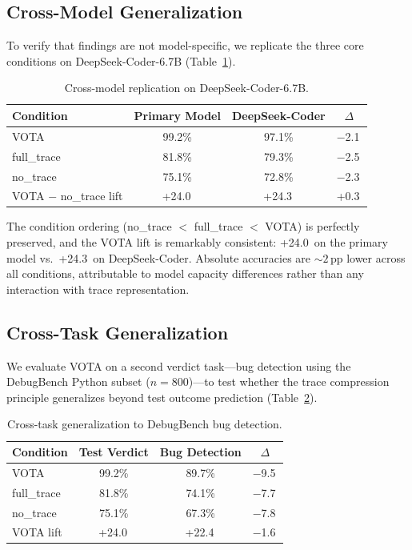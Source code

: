 \documentclass[11pt]{article}
\newcommand{\vota}{\textsc{VOTA}}
\newcommand{\pp}{\,\text{pp}}
\begin{document}
\subsection{Cross-Model Generalization}

To verify that findings are not model-specific, we replicate the three core conditions on DeepSeek-Coder-6.7B (Table~\ref{tab:crossmodel}).

\begin{table}[t]
\centering
\caption{Cross-model replication on DeepSeek-Coder-6.7B.}
\label{tab:crossmodel}
\small
\begin{tabular}{lccc}
\toprule
\textbf{Condition} & \textbf{Primary Model} & \textbf{DeepSeek-Coder} & \textbf{$\Delta$} \\
\midrule
\vota{} & 99.2\% & 97.1\% & $-$2.1\pp{} \\
full\_trace & 81.8\% & 79.3\% & $-$2.5\pp{} \\
no\_trace & 75.1\% & 72.8\% & $-$2.3\pp{} \\
\midrule
\vota{} $-$ no\_trace lift & +24.0\pp{} & +24.3\pp{} & +0.3\pp{} \\
\bottomrule
\end{tabular}
\end{table}

The condition ordering (no\_trace $<$ full\_trace $<$ \vota{}) is perfectly preserved, and the \vota{} lift is remarkably consistent: +24.0\pp{} on the primary model vs.\ +24.3\pp{} on DeepSeek-Coder. Absolute accuracies are ${\sim}2\pp$ lower across all conditions, attributable to model capacity differences rather than any interaction with trace representation.

\subsection{Cross-Task Generalization}

We evaluate \vota{} on a second verdict task---bug detection using the DebugBench Python subset ($n{=}800$)---to test whether the trace compression principle generalizes beyond test outcome prediction (Table~\ref{tab:crosstask}).

\begin{table}[t]
\centering
\caption{Cross-task generalization to DebugBench bug detection.}
\label{tab:crosstask}
\small
\begin{tabular}{lccc}
\toprule
\textbf{Condition} & \textbf{Test Verdict} & \textbf{Bug Detection} & \textbf{$\Delta$} \\
\midrule
\vota{} & 99.2\% & 89.7\% & $-$9.5\pp{} \\
full\_trace & 81.8\% & 74.1\% & $-$7.7\pp{} \\
no\_trace & 75.1\% & 67.3\% & $-$7.8\pp{} \\
\midrule
\vota{} lift & +24.0\pp{} & +22.4\pp{} & $-$1.6\pp{} \\
\bottomrule
\end{tabular}
\end{table}
\end{document}

